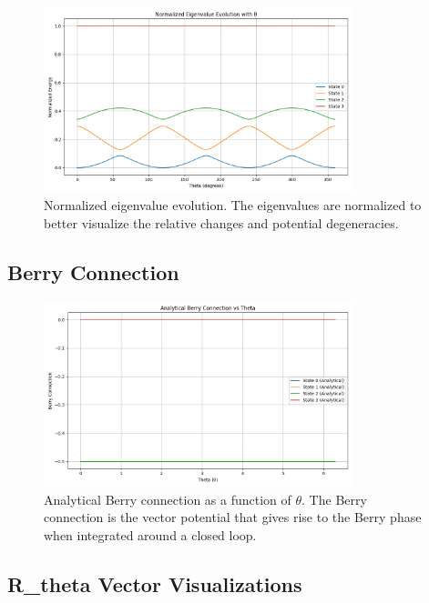 \documentclass[12pt,a4paper]{article}
\begin{document}
\begin{figure}[H]
    \centering
    \includegraphics[width=0.8\textwidth]{improved_berry_phase_results/normalized_eigenvalue_evolution.png}
    \caption{Normalized eigenvalue evolution. The eigenvalues are normalized to better visualize the relative changes and potential degeneracies.}
    \label{fig:normalized_eigenvalue_evolution}
\end{figure}

\subsection{Berry Connection}

\begin{figure}[H]
    \centering
    \includegraphics[width=0.8\textwidth]{improved_berry_phase_results/analytical_berry_connection.png}
    \caption{Analytical Berry connection as a function of $\theta$. The Berry connection is the vector potential that gives rise to the Berry phase when integrated around a closed loop.}
    \label{fig:analytical_berry_connection}
\end{figure}

\subsection{R\_theta Vector Visualizations}
\end{document}

